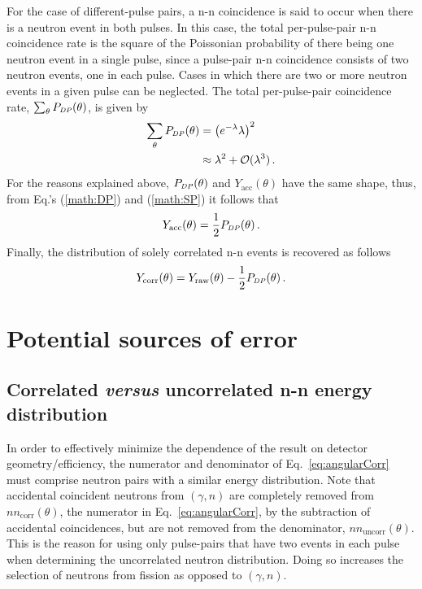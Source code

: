 \documentclass[%
 reprint,
 amsmath,amssymb,
 aps,
 nofootinbib
]{revtex4-1}
\begin{document}
For the case of different-pulse pairs, a n-n coincidence is said to occur when there is a neutron event in both pulses.
In this case, the total per-pulse-pair n-n coincidence rate is the square of the Poissonian probability of there being one neutron event in a single pulse, since a pulse-pair n-n coincidence consists of two neutron events, one in each pulse.
Cases in which there are two or more neutron events in a given pulse can be neglected.
The total per-pulse-pair coincidence rate, $\sum_{\theta} P_{\scaleto{DP}{4pt}}(\theta)$, is given by 
\begin{equation} \label{math:DP}
    \begin{split}
   \sum_{\theta} P_{\scaleto{DP}{4pt}}(\theta)&= \left(e^{-\lambda}\lambda\right)^{2} \\
    &\approx \lambda^2 + \mathcal{O}(\lambda^3) \, .
    \end{split}
\end{equation}
For the reasons explained above, $P_{\scaleto{DP}{4pt}}(\theta)$ and $Y_{\text{acc}}(\theta)$ have the same shape, thus, from Eq.'s (\ref{math:DP}) and (\ref{math:SP}) it follows that 
\begin{equation}
\label{eq:uncorr_DP}
Y_{\text{acc}}(\theta) = \frac{1}{2}P_{\scaleto{DP}{4pt}}(\theta) \,.
\end{equation}
Finally, the distribution of solely correlated n-n events is recovered as follows
\begin{equation}
\label{eq:uncorr_DP}
Y_{\text{corr}}(\theta) = Y_{\text{raw}}(\theta) - \frac{1}{2}P_{\scaleto{DP}{4pt}}(\theta) \,.
\end{equation}

\section{Potential sources of error}
\subsection{Correlated \emph{versus} uncorrelated n-n energy distribution} 
\label{sec:n_n_erg_dist}
In order to effectively minimize the dependence of the result on detector geometry/efficiency, the numerator and denominator of Eq.~\ref{eq:angularCorr} must comprise neutron pairs with a similar energy distribution.
Note that accidental coincident neutrons from $(\gamma,n)$ are completely removed from $nn_{\text{corr}}(\theta)$, the numerator in Eq.~\ref{eq:angularCorr}, by the subtraction of accidental coincidences, but are not removed from the denominator, $nn_{\text{uncorr}}(\theta)$.
This is the reason for using only pulse-pairs that have two events in each pulse when determining the uncorrelated neutron distribution.
Doing so increases the selection of neutrons from fission as opposed to $(\gamma,n)$. 
\end{document}
